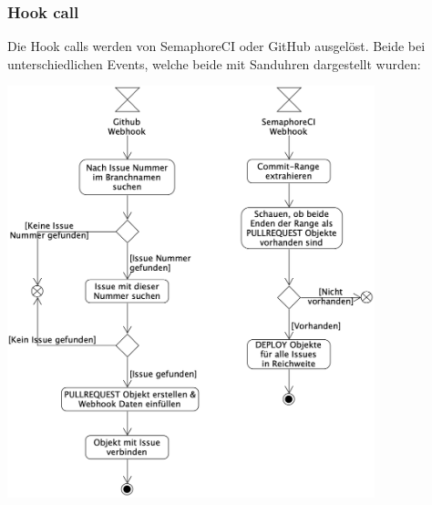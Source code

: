 \subsubsection{Hook call}
Die Hook calls werden von SemaphoreCI oder GitHub ausgelöst. Beide bei unterschiedlichen Events, welche beide mit Sanduhren
dargestellt wurden:
\begin{center}
  \includegraphics[width=0.8\textwidth]{images/activity/webhook.png}
  \label{fig:activity_hook_call}
\end{center}

